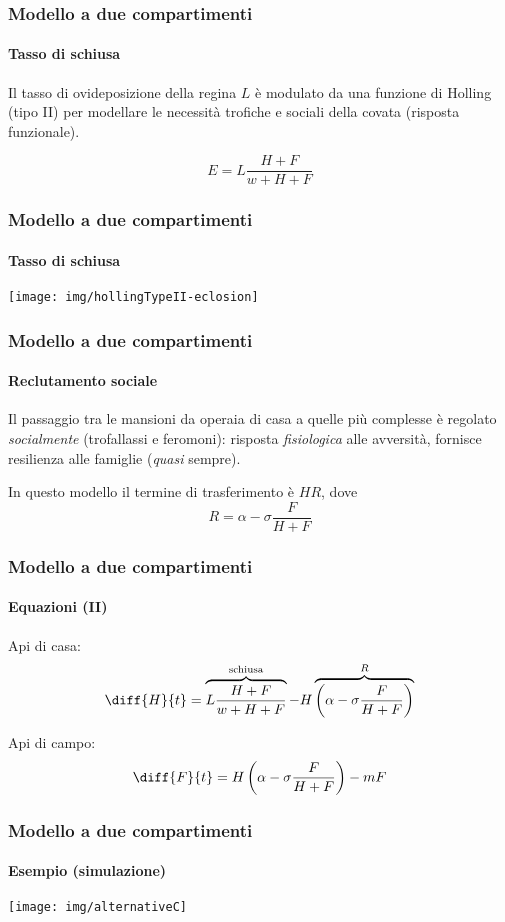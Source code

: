\documentclass[]{beamer}
\begin{document}
\begin{frame}
    \frametitle{Modello a due compartimenti}
    \framesubtitle{Tasso di schiusa}

    Il tasso di ovideposizione della regina $L$ è modulato da una funzione di Holling (tipo II)
    per modellare le necessità trofiche e sociali della covata (risposta funzionale).

    \pause
    $$E = L \frac{H+F}{w+H+F}$$

\end{frame}

\begin{frame}
    \frametitle{Modello a due compartimenti}
    \framesubtitle{Tasso di schiusa}

    \begin{center}
        \texttt{[image: img/hollingTypeII-eclosion]}
    \end{center}
\end{frame}


\begin{frame}
    \frametitle{Modello a due compartimenti}
    \framesubtitle{Reclutamento sociale}

    Il passaggio tra le mansioni da operaia di casa a quelle più complesse è regolato \emph{socialmente}
    (trofallassi e feromoni):
    \pause
    risposta \emph{fisiologica} alle avversità,
    \pause
    fornisce resilienza alle famiglie \pause (\emph{quasi} sempre).

    \pause
    In questo modello il termine di trasferimento è $H R$, dove
    $$R = \alpha - \sigma \frac{F}{H+F}$$
\end{frame}

\begin{frame}
    \frametitle{Modello a due compartimenti}
    \framesubtitle{Equazioni (II)}

    Api di casa:
    $$\diff{H}{t} = \overbrace{L \frac{H+F}{w+H+F}}^{\text{schiusa}} - H
    \overbrace{\left( \alpha - \sigma \frac{F}{H+F} \right)}^{R} $$

    \pause
    Api di campo:
    $$\diff{F}{t} = H \left( \alpha - \sigma \frac{F}{H+F} \right) - mF $$
\end{frame}

\begin{frame}
    \frametitle{Modello a due compartimenti}
    \framesubtitle{Esempio (simulazione)}

    \begin{center}
        \texttt{[image: img/alternativeC]}
    \end{center}
\end{frame}
\end{document}
